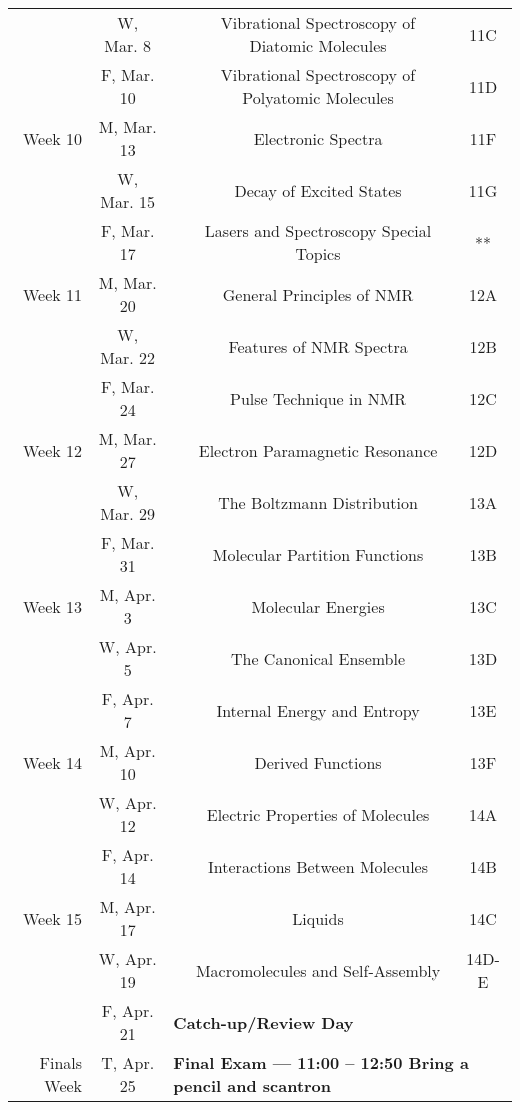 \begin{tabular}{rcccc}
& W, Mar. 8&& Vibrational Spectroscopy of Diatomic Molecules & 11C\\
& F, Mar. 10&& Vibrational Spectroscopy of Polyatomic Molecules & 11D\\
\midrule
Week 10 & M, Mar. 13&& Electronic Spectra & 11F\\
& W, Mar. 15&& Decay of Excited States & 11G\\
& F, Mar. 17&& Lasers and Spectroscopy Special Topics & **\\
\midrule
Week 11 & M, Mar. 20&& General Principles of NMR & 12A\\
& W, Mar. 22&& Features of NMR Spectra & 12B\\
& F, Mar. 24&& Pulse Technique in NMR & 12C\\
\midrule
Week 12 & M, Mar. 27&& Electron Paramagnetic Resonance & 12D\\
& W, Mar. 29&& The Boltzmann Distribution & 13A\\
& F, Mar. 31&& Molecular Partition Functions & 13B\\
\midrule
Week 13 & M, Apr. 3&& Molecular Energies & 13C\\
& W, Apr. 5&& The Canonical Ensemble & 13D\\
& F, Apr. 7&& Internal Energy and Entropy & 13E\\
\midrule
Week 14 & M, Apr. 10&& Derived Functions & 13F\\
& W, Apr. 12&& Electric Properties of Molecules & 14A\\
& F, Apr. 14&& Interactions Between Molecules & 14B\\
\midrule
Week 15 & M, Apr. 17&& Liquids & 14C\\
& W, Apr. 19&& Macromolecules and Self-Assembly & 14D-E\\
& F, Apr. 21& \multicolumn{3}{l}{\textbf{Catch-up/Review Day}}\\
\midrule
Finals Week& T, Apr. 25& \multicolumn{3}{l}{\textbf{Final Exam --- 11:00 -- 12:50 Bring a pencil and scantron}}\\
\end{tabular}
